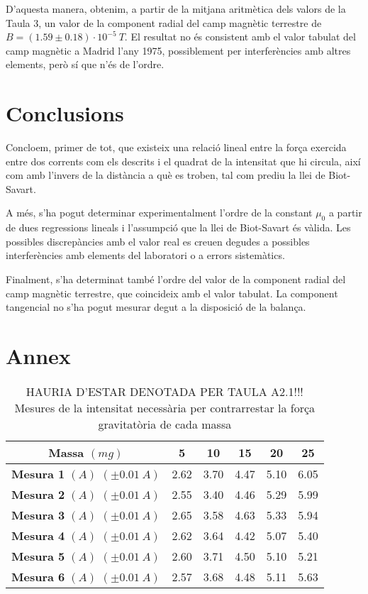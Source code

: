 \begin{multicols}{2}
\begin{table}
\begin{tabular}{|c|c|c|c|}
		\end{tabular}
	\end{table}
	D'aquesta manera, obtenim, a partir de la mitjana aritmètica dels valors de la Taula 3, un valor de la component radial del camp magnètic terrestre de $B=(1.59\pm0.18)\cdot10^{-5}\ \si{T}$. El resultat no és consistent amb el valor tabulat del camp magnètic a Madrid l'any 1975, possiblement per interferències amb altres elements, però sí que n'és de l'ordre.

	\section{Conclusions}
	Concloem, primer de tot, que existeix una relació lineal entre la força exercida entre dos corrents com els descrits i el quadrat de la intensitat que hi circula, així com amb l'invers de la distància a què es troben, tal com prediu la llei de Biot-Savart.

	A més, s'ha pogut determinar experimentalment l'ordre de la constant $\mu_0$ a partir de dues regressions lineals i l'assumpció que la llei de Biot-Savart és vàlida. Les possibles discrepàncies amb el valor real es creuen degudes a possibles interferències amb elements del laboratori o a errors sistemàtics.

	Finalment, s'ha determinat també l'ordre del valor de la component radial del camp magnètic terrestre, que coincideix amb el valor tabulat. La component tangencial no s'ha pogut mesurar degut a la disposició de la balança.


	\section*{Annex}

	\begin{table}
		\centering
		\caption{HAURIA D'ESTAR DENOTADA PER TAULA A2.1!!! Mesures de la intensitat necessària per contrarrestar la força gravitatòria de cada massa}
		\vspace{0,2cm}
		\begin{tabular}{|c|||c||c||c||c||c|}
			\hline
			\textbf{Massa} $\si{(mg)}$ &\textbf{5}&\textbf{10}&\textbf{15}&\textbf{20}&\textbf{25} \\\hline
			\textbf{Mesura 1} $\si{(A)}$ $(\pm0.01\ \si{A})$&2.62&3.70&4.47&5.10&6.05\\\hline
			\textbf{Mesura 2} $\si{(A)}$ $(\pm0.01\ \si{A})$&2.55&3.40&4.46&5.29&5.99\\\hline
			\textbf{Mesura 3} $\si{(A)}$ $(\pm0.01\ \si{A})$&2.65&3.58&4.63&5.33&5.94\\\hline
			\textbf{Mesura 4} $\si{(A)}$ $(\pm0.01\ \si{A})$&2.62&3.64&4.42&5.07&5.40\\\hline
			\textbf{Mesura 5} $\si{(A)}$ $(\pm0.01\ \si{A})$&2.60&3.71&4.50&5.10&5.21\\\hline
			\textbf{Mesura 6} $\si{(A)}$ $(\pm0.01\ \si{A})$&2.57&3.68&4.48&5.11&5.63\\\hline
		\end{tabular}
	\end{table}



\end{multicols}
